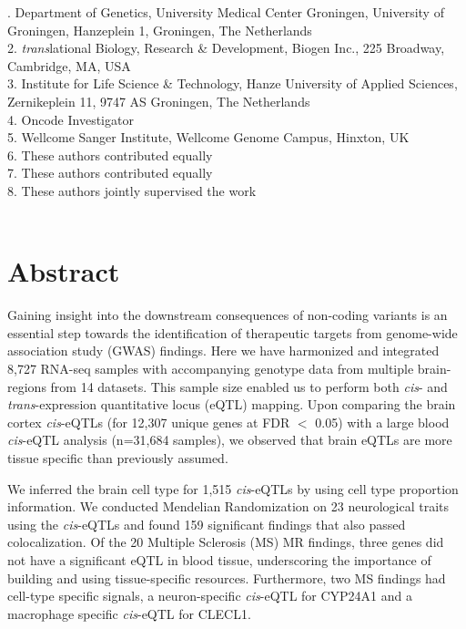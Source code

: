 . Department of Genetics, University Medical Center Groningen, University of Groningen, Hanzeplein 1, Groningen, The Netherlands \\
2. \emph{trans}lational Biology, Research \& Development, Biogen Inc., 225 Broadway, Cambridge, MA, USA \\
3. Institute for Life Science \& Technology, Hanze University of Applied Sciences, Zernikeplein 11, 9747 AS Groningen, The Netherlands \\
4. Oncode Investigator \\
5. Wellcome Sanger Institute, Wellcome Genome Campus, Hinxton, UK \\
6. These authors contributed equally \\
7. These authors contributed equally \\
8. These authors jointly supervised the work 
\\
\\

\newpage

\section*{Abstract}
Gaining insight into the downstream consequences of non-coding variants is an essential step towards the identification of therapeutic targets from genome-wide association study (GWAS) findings.  Here we have harmonized and integrated 8,727 RNA-seq samples with accompanying genotype data from multiple brain-regions from 14 datasets. This sample size enabled us to perform both \emph{cis}- and \emph{trans}-expression quantitative locus (eQTL) mapping. Upon comparing the brain cortex \emph{cis}-eQTLs (for 12,307 unique genes at FDR $<$ 0.05) with a large blood \emph{cis}-eQTL analysis (n=31,684 samples), we observed that brain eQTLs are more tissue specific than previously assumed. 

We inferred the brain cell type for 1,515 \emph{cis}-eQTLs by using cell type proportion information. We conducted Mendelian Randomization on 23 neurological traits using the \emph{cis}-eQTLs and found 159 significant findings that also passed colocalization. Of the 20 Multiple Sclerosis (MS) MR findings, three genes did not have a significant eQTL in blood tissue, underscoring the importance of building and using tissue-specific resources. Furthermore, two MS findings had cell-type specific signals, a neuron-specific \emph{cis}-eQTL for CYP24A1 and a macrophage specific \emph{cis}-eQTL for CLECL1.  

